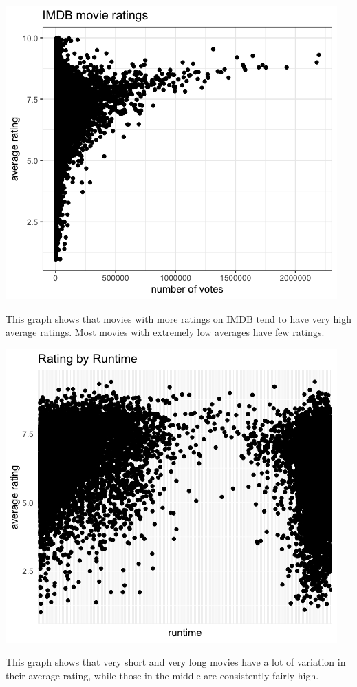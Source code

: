 \documentclass{article}
\begin{document}
\includegraphics[scale = .7]{PS6b_Hopewell.png}

\caption{This graph shows that movies with more ratings on IMDB tend to have very high average ratings. Most movies with extremely low averages have few ratings.}

\includegraphics[scale=.7]{PS6c_Hopewell.png}

\caption{This graph shows that very short and very long movies have a lot of variation in their average rating, while those in the middle are consistently fairly high.}
\end{document}
